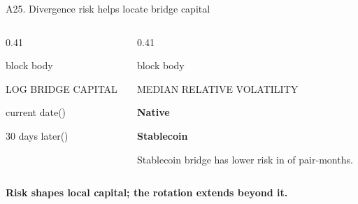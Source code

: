\begin{frame}{A25. Divergence risk helps locate bridge capital}
\vspace{0.20cm}
\begin{columns}[T,totalwidth=0.90\textwidth]
\begin{column}{0.41\textwidth}
\begin{beamercolorbox}[rounded=true,sep=0.32cm,wd=\textwidth]{block body}
{\small\color{muted} LOG BRIDGE CAPITAL\par}
\vspace{0.14cm}
{\fontsize{23}{25}\selectfont\bfseries\color{ucldark}\BridgeRiskCurrentVolEffect\par}
{\small current date\quad (\BridgeRiskCurrentVolSE)\par}
\vspace{0.18cm}
{\fontsize{23}{25}\selectfont\bfseries\color{stable}\BridgeRiskFutureVolEffect\par}
{\small 30 days later\quad (\BridgeRiskFutureVolSE)\par}
\end{beamercolorbox}
\end{column}
\hfill
\begin{column}{0.41\textwidth}
\begin{beamercolorbox}[rounded=true,sep=0.32cm,wd=\textwidth]{block body}
{\small\color{muted} MEDIAN RELATIVE VOLATILITY\par}
\vspace{0.14cm}
{\large\bfseries\color{ucldark}Native\quad \BridgeRiskNativeMedianVol\par}
\vspace{0.18cm}
{\large\bfseries\color{accent}Stablecoin\quad \BridgeRiskStableMedianVol\par}
\vspace{0.18cm}
{\small Stablecoin bridge has lower risk in \textbf{\BridgeRiskStableLowerShare} of pair-months.}
\end{beamercolorbox}
\end{column}
\end{columns}
\vspace{0.36cm}
{\large\bfseries\color{stable}\centering Risk shapes local capital; the rotation extends beyond it.\par}
\end{frame}
